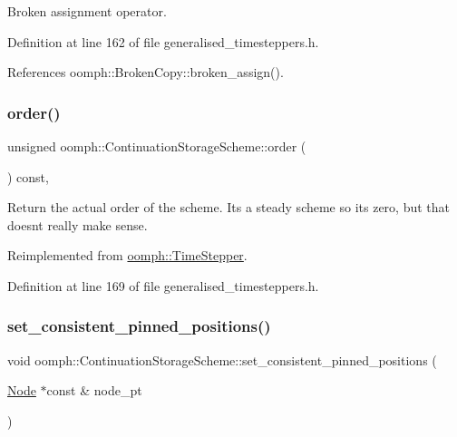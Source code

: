 Broken assignment operator. 



Definition at line 162 of file generalised\+\_\+timesteppers.\+h.



References oomph\+::\+Broken\+Copy\+::broken\+\_\+assign().

\mbox{\label{classoomph_1_1ContinuationStorageScheme_ab9ebd03333ee68a6ec5038386134d79a}} 
\subsubsection{\texorpdfstring{order()}{order()}}
{\footnotesize\ttfamily unsigned oomph\+::\+Continuation\+Storage\+Scheme\+::order (\begin{DoxyParamCaption}{ }\end{DoxyParamCaption}) const\hspace{0.3cm}{\ttfamily [inline]}, {\ttfamily [virtual]}}

Return the actual order of the scheme. It\textquotesingle{}s a steady scheme so it\textquotesingle{}s zero, but that doesn\textquotesingle{}t really make sense. 

Reimplemented from \hyperlink{classoomph_1_1TimeStepper_a251e5d4b37381e582b7cf4c554e2e724}{oomph\+::\+Time\+Stepper}.



Definition at line 169 of file generalised\+\_\+timesteppers.\+h.

\mbox{\label{classoomph_1_1ContinuationStorageScheme_ad08f35407fff9e171312d482cfdeacc0}} 
\subsubsection{\texorpdfstring{set\+\_\+consistent\+\_\+pinned\+\_\+positions()}{set\_consistent\_pinned\_positions()}}
{\footnotesize\ttfamily void oomph\+::\+Continuation\+Storage\+Scheme\+::set\+\_\+consistent\+\_\+pinned\+\_\+positions (\begin{DoxyParamCaption}\item[{\hyperlink{classoomph_1_1Node}{Node} $\ast$const \&}]{node\+\_\+pt }\end{DoxyParamCaption})\hspace{0.3cm}{\ttfamily [inline]}}



